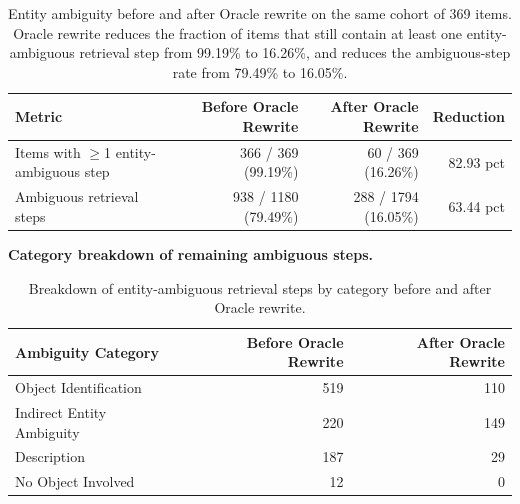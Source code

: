 \begin{table}[t]
\centering
\small
\setlength{\tabcolsep}{6pt}
\begin{tabular}{lrrr}
\hline
Metric & Before Oracle Rewrite & After Oracle Rewrite & Reduction \\
\hline
Items with $\geq$1 entity-ambiguous step & 366 / 369 (99.19\%) & 60 / 369 (16.26\%) & 82.93 pct \\
Ambiguous retrieval steps & 938 / 1180 (79.49\%) & 288 / 1794 (16.05\%) & 63.44 pct \\
\hline
\end{tabular}
\caption{Entity ambiguity before and after Oracle rewrite on the same cohort of 369 items. Oracle rewrite reduces the fraction of items that still contain at least one entity-ambiguous retrieval step from 99.19\% to 16.26\%, and reduces the ambiguous-step rate from 79.49\% to 16.05\%.}
\label{tab:oracle-rewrite-entity-ambiguity}
\end{table}

\noindent\textbf{Category breakdown of remaining ambiguous steps.}
\begin{table}[t]
\centering
\small
\setlength{\tabcolsep}{8pt}
\begin{tabular}{lrr}
\hline
Ambiguity Category & Before Oracle Rewrite & After Oracle Rewrite \\
\hline
Object Identification & 519 & 110 \\
Indirect Entity Ambiguity & 220 & 149 \\
Description & 187 & 29 \\
No Object Involved & 12 & 0 \\
\hline
\end{tabular}
\caption{Breakdown of entity-ambiguous retrieval steps by category before and after Oracle rewrite.}
\label{tab:oracle-rewrite-entity-ambiguity-breakdown}
\end{table}

